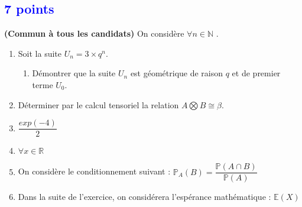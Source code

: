 \documentclass[11pt]{article}
\newcommand{\hard}[2]{\hspace*{0.5cm} \textbf{( !!! )}\\}
\newcommand{\R}{\mathbb{R}} %
\newcommand{\N}{\mathbb{N}} %
\newcommand{\E}{\mathbb{E}} %
\renewcommand{\P}{\mathbb{P}} %
\begin{document}


\subsection{\textcolor{blue}{\hfill 7 points}}
\label{courbe}

\medskip
\noindent\textbf{(Commun à tous les candidats) \hard }
\medskip
On considère $\forall n \in \N$ . \\

\begin{enumerate}

\item Soit la suite $U_{n}=3 \times q^{n}$.

\begin{enumerate}

\item Démontrer que la suite $U_{n}$ est géométrique de raison $q$ et de premier terme $U_{0}$. 

\end{enumerate}

\item Déterminer par le calcul tensoriel la relation $A \bigotimes B \cong \beta$.

\item $\dfrac{exp (-4)}{2}$

\item $\forall x \in \R$

\item On considère le conditionnement suivant : $\P_{A}(B) = \dfrac{\P(A \cap B)}{\P(A)}$
\item Dans la suite de l'exercice, on considérera l'espérance mathématique : $\E(X)$

\end{enumerate}


\medskip
\end{document}
